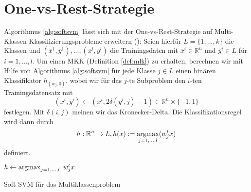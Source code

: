 \section{One-vs-Rest-Strategie}\label{sec:ovr}
Algorithmus \ref{alg:softsvm} lässt sich mit der One-vs-Rest-Strategie auf Multi-Klassen-Klassifizierungsprobleme erweitern (\cite{hsu-comp-02}): Seien hierfür $L= \{1,...,k\}$ die Klassen und $(\bar{x}^1,\bar{y}^1),...,(\bar{x}^l,\bar{y}^l)$ die Trainingsdaten mit $\bar{x}^i \in \mathbb{R}^n$ und $\bar{y}^i \in L$ für $i = 1,...,l$. Um einen MKK (Definition \ref{def:mlk}) zu erhalten, berechnen wir mit Hilfe von Algorithmus \ref{alg:softsvm} für jede Klasse $j \in L$ einen binären Klassifikator $h_{(w_j,0)}$, wobei wir für das $j$-te Subproblem den $i$-ten Trainingsdatensatz mit 
$$(x^{i},y^{i}) \gets (\bar{x}^i, 2\delta(\bar{y}^i, j)-1) \in \mathbb{R}^n \times \{-1,1\}
$$ 
festlegen. Mit $\delta(i,j)$ meinen wir das Kronecker-Delta. Die Klassifikationsregel wird dann durch
$$
h: \mathbb{R}^n \rightarrow L, h(x) := \operatorname*{argmax}_{j=1,...,l} (w_j^t x)
$$ 
definiert.

\begin{algorithm}[hbtp]
$h \gets \operatorname*{argmax}_{j=1,...,l} \; w_j^t x$
\caption{Soft-SVM für das Multiklassenproblem}
\label{alg:mkk-softsvm}
\end{algorithm}